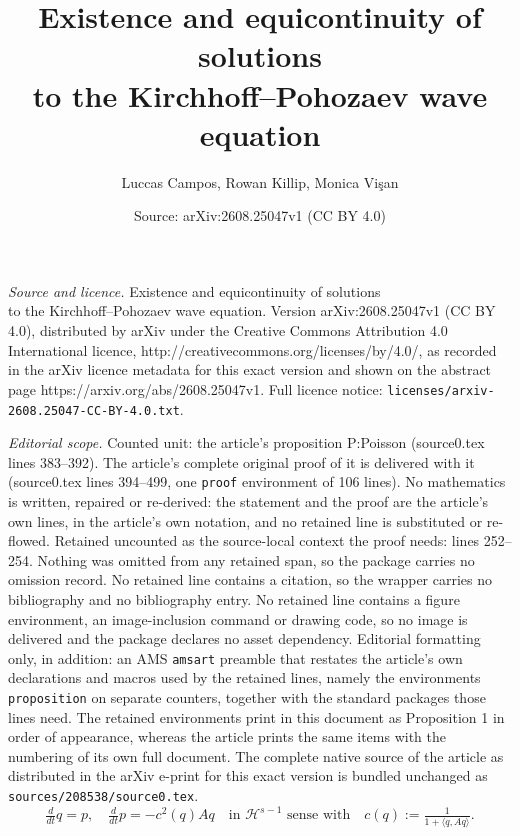 \documentclass[10pt,a4paper]{amsart}
\title{Existence and equicontinuity of solutions\\to the Kirchhoff--Pohozaev wave equation}
\author{Luccas Campos, Rowan Killip, Monica Vi\c{s}an}
\date{Source: arXiv:2608.25047v1 (CC BY 4.0)}
\renewcommand{\H}{\mathcal H}
\newcommand{\qtq}[1]{\quad\text{#1}\quad}
\begin{document}
\maketitle

\noindent\emph{Source and licence.} Existence and equicontinuity of solutions\\to the Kirchhoff--Pohozaev wave equation. Version arXiv:2608.25047v1 (CC BY 4.0), distributed by arXiv under the Creative Commons Attribution 4.0 International licence, http://creativecommons.org/licenses/by/4.0/, as recorded in the arXiv licence metadata for this exact version and shown on the abstract page https://arxiv.org/abs/2608.25047v1. Full licence notice: \texttt{licenses/arxiv-2608.25047-CC-BY-4.0.txt}.\par\smallskip

\noindent\textit{Editorial scope.} Counted unit: the article's proposition P:Poisson (source0.tex lines 383--392). The article's complete original proof of it is delivered with it (source0.tex lines 394--499, one \texttt{proof} environment of 106 lines). No mathematics is written, repaired or re-derived: the statement and the proof are the article's own lines, in the article's own notation, and no retained line is substituted or re-flowed.  Retained uncounted as the source-local context the proof needs: lines 252--254.  Nothing was omitted from any retained span, so the package carries no omission record.  No retained line contains a citation, so the wrapper carries no bibliography and no bibliography entry.  No retained line contains a figure environment, an image-inclusion command or drawing code, so no image is delivered and the package declares no asset dependency.  Editorial formatting only, in addition: an AMS \texttt{amsart} preamble that restates the article's own declarations and macros used by the retained lines, namely the environments \texttt{proposition} on separate counters, together with the standard packages those lines need.  The retained environments print in this document as Proposition 1 in order of appearance, whereas the article prints the same items with the numbering of its own full document.  The complete native source of the article as distributed in the arXiv e-print for this exact version is bundled unchanged as \texttt{sources/208538/source0.tex}.
\begin{equation}\label{KP+}
\tfrac{d}{dt}q = p, \quad \tfrac{d}{dt}p = -c^2(q) A q \qtq{in $\H^{s-1}$ sense with}c(q) := \tfrac{1}{1 + \langle q,A q\rangle} .
\end{equation}
\end{document}
